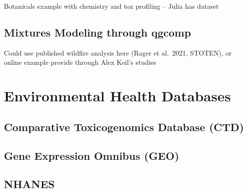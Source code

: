 \documentclass[
]{book}
\begin{document}
Botanicals example with chemistry and tox profiling -- Julia has dataset

\hypertarget{mixtures-modeling-through-qgcomp}{%
\section{Mixtures Modeling through qgcomp}\label{mixtures-modeling-through-qgcomp}}

Could use published wildfire analysis here (Rager et al.~2021, STOTEN), or online example provide through Alex Keil's studies

\hypertarget{environmental-health-databases}{%
\chapter{Environmental Health Databases}\label{environmental-health-databases}}

\hypertarget{comparative-toxicogenomics-database-ctd}{%
\section{Comparative Toxicogenomics Database (CTD)}\label{comparative-toxicogenomics-database-ctd}}

\hypertarget{gene-expression-omnibus-geo}{%
\section{Gene Expression Omnibus (GEO)}\label{gene-expression-omnibus-geo}}

\hypertarget{nhanes}{%
\section{NHANES}\label{nhanes}}
\end{document}
